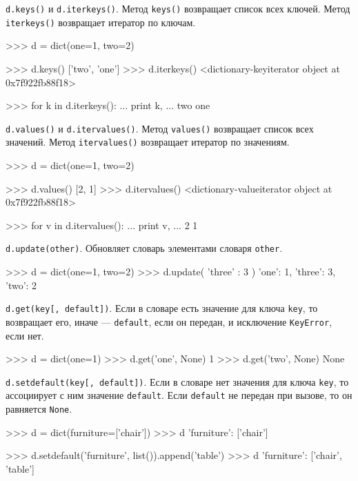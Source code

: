 \lstinline{d.keys()} и \lstinline{d.iterkeys()}. Метод \lstinline{keys()} возвращает список всех ключей. Метод \lstinline{iterkeys()} возвращает итератор по ключам.
\begin{pylst}{}{}
>>> d = dict(one=1, two=2)

>>> d.keys()
['two', 'one']
>>> d.iterkeys()
<dictionary-keyiterator object at 0x7f922fb88f18>

>>> for k in d.iterkeys():
...     print k,
...
two one
\end{pylst}

\lstinline{d.values()} и \lstinline{d.itervalues()}. Метод \lstinline{values()} возвращает список всех значений. Метод \lstinline{itervalues()} возвращает итератор по значениям.
\begin{pylst}{}{}
>>> d = dict(one=1, two=2)

>>> d.values()
[2, 1]
>>> d.itervalues()
<dictionary-valueiterator object at 0x7f922fb88f18>

>>> for v in d.itervalues():
...     print v,
...
2 1
\end{pylst}

\lstinline{d.update(other)}. Обновляет словарь элементами словаря \lstinline{other}.
\begin{pylst}{}{}
>>> d = dict(one=1, two=2)
>>> d.update({ 'three' : 3 })
{'one': 1, 'three': 3, 'two': 2}
\end{pylst}

\lstinline{d.get(key[, default])}. Если в словаре есть значение для ключа \lstinline{key}, то возвращает его, иначе — \lstinline{default}, если он передан, и исключение \lstinline{KeyError}, если нет.
\begin{pylst}{}{}
>>> d = dict(one=1)
>>> d.get('one', None)
1
>>> d.get('two', None)
None
\end{pylst}

\lstinline{d.setdefault(key[, default])}. Если в словаре нет значения для ключа \lstinline{key}, то ассоциирует с ним значение \lstinline{default}. Если \lstinline{default} не передан при вызове, то он равняется \lstinline{None}.
\begin{pylst}{}{}
>>> d = dict(furniture=['chair'])
>>> d
{'furniture': ['chair']}

>>> d.setdefault('furniture', list()).append('table')
>>> d
{'furniture': ['chair', 'table']}
\end{pylst}

